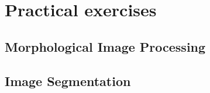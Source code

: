 \section{Practical exercises}
\subsection{Morphological Image Processing}

\subsection{Image Segmentation}



